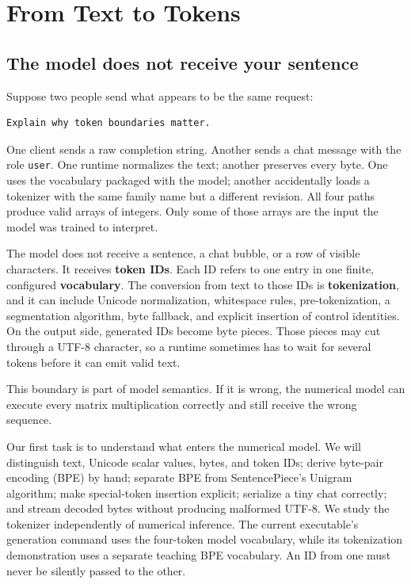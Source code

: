 \chapter{From Text to Tokens}\label{chapter-2-from-text-to-tokens}\label{app:tokens}
\section{The model does not receive your
sentence}\label{the-model-does-not-receive-your-sentence}

Suppose two people send what appears to be the same request:

\begin{verbatim}
Explain why token boundaries matter.
\end{verbatim}

One client sends a raw completion string. Another sends a chat message
with the role \texttt{user}. One runtime normalizes the text; another
preserves every byte. One uses the vocabulary packaged with the model;
another accidentally loads a tokenizer with the same family name but a
different revision. All four paths produce valid arrays of integers.
Only some of those arrays are the input the model was trained to
interpret.

The model does not receive a sentence, a chat bubble, or a row of
visible characters. It receives \textbf{token IDs}. Each ID refers to
one entry in one finite, configured \textbf{vocabulary}. The conversion
from text to those IDs is \textbf{tokenization}, and it can include
Unicode normalization, whitespace rules, pre-tokenization, a
segmentation algorithm, byte fallback, and explicit insertion of control
identities. On the output side, generated IDs become byte pieces. Those
pieces may cut through a UTF-8 character, so a runtime sometimes has to
wait for several tokens before it can emit valid text.

This boundary is part of model semantics. If it is wrong, the numerical
model can execute every matrix multiplication correctly and still
receive the wrong sequence.

Our first task is to understand what enters the numerical model. We will distinguish
text, Unicode scalar values, bytes, and token IDs; derive byte-pair
encoding (BPE) by hand; separate BPE from SentencePiece's Unigram
algorithm; make special-token insertion explicit; serialize a tiny chat
correctly; and stream decoded bytes without producing malformed UTF-8.
We study the tokenizer independently of numerical inference. The current
executable's generation command uses the four-token model vocabulary, while
its tokenization demonstration uses a separate teaching BPE vocabulary.
An ID from one must never be silently passed to the other.

